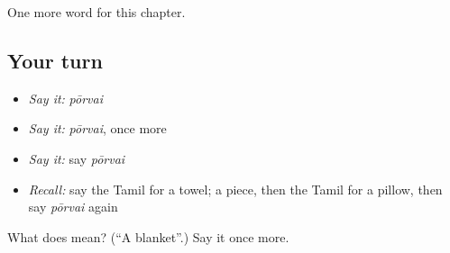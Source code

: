 \begin{grammarlens}[title={What you've built}]
One more word for this chapter.
\end{grammarlens}

\subsection*{Your turn}
\begin{itemize}
\raggedright
  \item \emph{Say it:} \emph{pōrvai}
  \item \emph{Say it:} \emph{pōrvai}, once more
  \item \emph{Say it:} say \emph{pōrvai}
  \item \emph{Recall:} say the Tamil for a towel; a piece, then the Tamil for a pillow, then say \emph{pōrvai} again
\end{itemize}

\begin{tcolorbox}[breakable,colback=teal!4,colframe=teal!35!black,title={Before you move on}]
What does  mean? (\textquotedblleft{}A blanket\textquotedblright{}.) Say it once more.
\end{tcolorbox}
